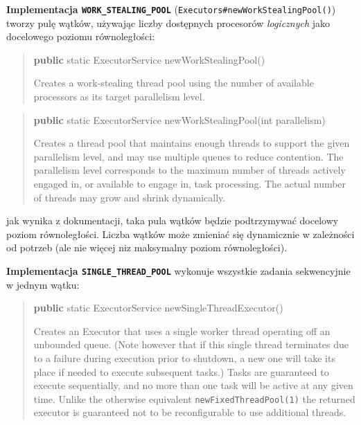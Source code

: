 \documentclass[11pt]{article}
\newenvironment{Shaded}{}{}
\newcommand{\KeywordTok}[1]{\textcolor[rgb]{0.00,0.44,0.13}{\textbf{{#1}}}}
\newcommand{\DataTypeTok}[1]{\textcolor[rgb]{0.56,0.13,0.00}{{#1}}}
\newcommand{\FunctionTok}[1]{\textcolor[rgb]{0.02,0.16,0.49}{{#1}}}
\newcommand{\NormalTok}[1]{{#1}}
\newcommand{\OperatorTok}[1]{\textcolor[rgb]{0.40,0.40,0.40}{{#1}}}
\newcommand{\BuiltInTok}[1]{{#1}}
\begin{document}
    \textbf{Implementacja \texttt{WORK\_STEALING\_POOL}}
(\texttt{Executors\#newWorkStealingPool()}) tworzy pulę wątków, używając
liczby dostępnych procesorów \emph{logicznych} jako docelowego poziomu
równoległości:

\begin{quote}
\begin{Shaded}
\begin{Highlighting}[]
\KeywordTok{public} \DataTypeTok{static} \BuiltInTok{ExecutorService} \FunctionTok{newWorkStealingPool}\OperatorTok{()}
\end{Highlighting}
\end{Shaded}

Creates a work-stealing thread pool using the number of available
processors as its target parallelism level.
\end{quote}

\begin{quote}
\begin{Shaded}
\begin{Highlighting}[]
\KeywordTok{public} \DataTypeTok{static} \BuiltInTok{ExecutorService} \FunctionTok{newWorkStealingPool}\OperatorTok{(}\DataTypeTok{int}\NormalTok{ parallelism}\OperatorTok{)}
\end{Highlighting}
\end{Shaded}

Creates a thread pool that maintains enough threads to support the given
parallelism level, and may use multiple queues to reduce contention. The
parallelism level corresponds to the maximum number of threads actively
engaged in, or available to engage in, task processing. The actual
number of threads may grow and shrink dynamically.
\end{quote}

jak wynika z dokumentacji, taka pula wątków będzie podtrzymywać docelowy
poziom równoległości. Liczba wątków może zmieniać się dynamicznie w
zależności od potrzeb (ale nie więcej niz maksymalny poziom
równoległości).

    \textbf{Implementacja \texttt{SINGLE\_THREAD\_POOL}} wykonuje wszystkie
zadania sekwencyjnie w jednym wątku:

\begin{quote}
\begin{Shaded}
\begin{Highlighting}[]
\KeywordTok{public} \DataTypeTok{static} \BuiltInTok{ExecutorService} \FunctionTok{newSingleThreadExecutor}\OperatorTok{()}
\end{Highlighting}
\end{Shaded}

Creates an Executor that uses a single worker thread operating off an
unbounded queue. (Note however that if this single thread terminates due
to a failure during execution prior to shutdown, a new one will take its
place if needed to execute subsequent tasks.) Tasks are guaranteed to
execute sequentially, and no more than one task will be active at any
given time. Unlike the otherwise equivalent
\texttt{newFixedThreadPool(1)} the returned executor is guaranteed not
to be reconfigurable to use additional threads.
\end{quote}
\end{document}
